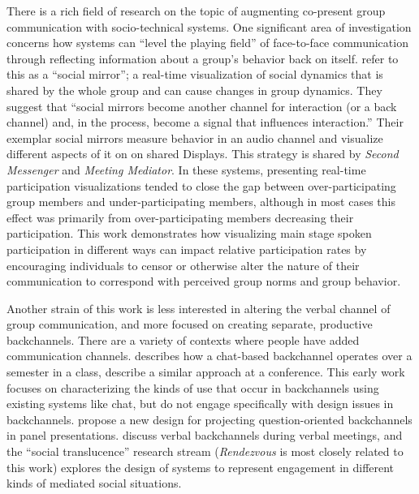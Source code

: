 There is a rich field of research on the topic of augmenting co-present group communication with socio-technical systems.  One significant area of investigation concerns how systems can ``level the playing field'' of face-to-face communication through reflecting information about a group's behavior back on itself. \citet{Karahalios:hu} refer to this as a ``social mirror''; a real-time visualization of social dynamics that is shared by the whole group and can cause changes in group dynamics. They suggest that ``social mirrors become another channel for interaction (or a back channel) and, in the process, become a signal that influences interaction.'' Their exemplar social mirrors measure behavior in an audio channel and visualize different aspects of it on on shared Displays. This strategy is shared by \emph{Second Messenger}\citep{DiMicco:2007ie} and \emph{Meeting Mediator}\citep{Kim:2008ip}.  In these systems, presenting real-time participation visualizations tended to close the gap between over-participating group members and under-participating members, although in most cases this effect was primarily from over-participating members decreasing their participation. This work demonstrates how visualizing main stage spoken participation in different ways can impact relative participation rates by encouraging individuals to censor or otherwise alter the nature of their communication to correspond with perceived group norms and group behavior.

Another strain of this work is less interested in altering the verbal channel of group communication, and more focused on creating separate, productive  backchannels. There are a variety of contexts where people have added communication channels. \citet{Yardi:2006uk} describes how a chat-based backchannel operates over a semester in a class, \citet{mccarthy_digital_2004} describe a similar approach at a conference. This early work focuses on characterizing the kinds of use that occur in backchannels using existing systems like chat, but do not engage specifically with design issues in backchannels. \citet{Harry:2009jh} propose a new design for projecting question-oriented backchannels in panel presentations.  \citet{Yankelovich:2005bx} discuss verbal backchannels during verbal meetings, and the ``social translucence'' research stream (\emph{Rendezvous} \citep{kellogg_leveraging_2006} is most closely related to this work) explores the design of systems to represent engagement in different kinds of mediated social situations.


